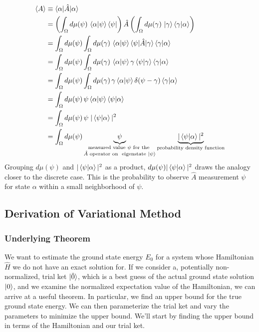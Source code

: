\documentclass[12pt]{article}
\begin{document}
\allowdisplaybreaks
\begin{align*}
    \braket{A} &\equiv \braket{\alpha | \hat{A} | \alpha}\\
    &= \left( \int_{\Omega} d\mu(\psi) \, \braket{\alpha | \psi }\bra{\psi} \right) \hat{A} \left( \int_{\Omega} d\mu(\gamma) \, \ket{\gamma}\braket{\gamma | \alpha} \right) \\
    &= \int_{\Omega} d\mu(\psi) \int_{\Omega} d\mu(\gamma) \, \braket{\alpha | \psi } \braket{\psi | \hat{A} | \gamma} \braket{\gamma | \alpha} \\
    &= \int_{\Omega} d\mu(\psi) \int_{\Omega} d\mu(\gamma) \, \braket{\alpha | \psi } \gamma \braket{\psi | \gamma} \braket{\gamma | \alpha} \\
    &= \int_{\Omega} d\mu(\psi) \int_{\Omega} d\mu(\gamma) \, \gamma \braket{\alpha | \psi } \delta(\psi - \gamma) \braket{\gamma | \alpha} \\
    &= \int_{\Omega} d\mu(\psi) \, \psi \braket{\alpha | \psi } \braket{\psi | \alpha} \\
    &= \int_{\Omega} d\mu(\psi) \, \psi \hspace{0.1cm} |\braket{\psi | \alpha}|^2 \\
    &= \int_{\Omega} d\mu(\psi) \underbrace{\psi}_{\substack{\text{measured value } \psi \text{ for the } \\ \hat{A} \text{ operator on } \text{ eigenstate } \ket{\psi}}} \underbrace{|\braket{\psi | \alpha}|^2}_{\substack{\text{probability density function}}}
\end{align*}
Grouping $d\mu(\psi)$ and $|\braket{\psi | \alpha}|^2$ as a product, $d\mu(\psi) |\braket{\psi | \alpha}|^2$ draws the analogy closer to the discrete case. This is the probability to observe  
$\hat{A}$ measurement $\psi$ for state $\alpha$ within a small neighborhood of $\psi$.

\subsection{Derivation of Variational Method}
\subsubsection{Underlying Theorem}
\hspace{1cm} We want to estimate the ground state energy $E_0$ for a system whose Hamiltonian $\hat{H}$ we do not have an exact solution for. If we consider a, potentially non-normalized, trial ket $\ket{\tilde{0}}$, which is a best guess of the actual ground state solution $\ket{0}$, and we examine the normalized expectation value of the Hamiltonian, we can arrive at a useful theorem. In particular, we find an upper bound for the true ground state energy. We can then parameterize the trial ket and vary the parameters to minimize the upper bound. We'll start by finding the upper bound in terms of the Hamiltonian and our trial ket.
\end{document}
